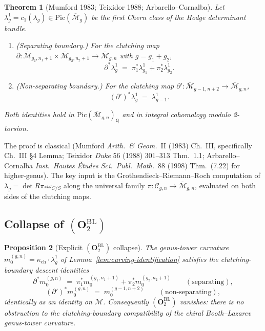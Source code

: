 \documentclass[11pt]{amsart}
\newtheorem{theorem}{Theorem}[section]
\newtheorem{proposition}[theorem]{Proposition}
\newcommand{\kch}{\kappa_{\mathrm{ch}}}
\newcommand{\Mbar}{\overline{\mathcal{M}}}
\newcommand{\bQ}{\mathbb{Q}}
\begin{document}
\begin{theorem}[Mumford 1983; Teixidor 1988; Arbarello--Cornalba]
\label{thm:mumford-boundary}
Let $\lambda_g^1 = c_1(\lambda_g) \in \mathrm{Pic}(\Mbar_g)$ be the
first Chern class of the Hodge determinant bundle.
\begin{enumerate}[leftmargin=2em]
\item \emph{(Separating boundary.)} For the clutching map
$\partial : \Mbar_{g_1,n_1+1} \times \Mbar_{g_2,n_2+1} \to
\Mbar_{g,n}$ with $g = g_1 + g_2$,
\[
\partial^* \lambda_g^1 \;=\;
\pi_1^* \lambda_{g_1}^1 + \pi_2^* \lambda_{g_2}^1.
\]
\item \emph{(Non-separating boundary.)} For the clutching map
$\partial' : \Mbar_{g-1,n+2} \to \Mbar_{g,n}$,
\[
(\partial')^* \lambda_g^1 \;=\; \lambda_{g-1}^1.
\]
\end{enumerate}
Both identities hold in $\mathrm{Pic}(\Mbar_{g,n})_\bQ$ and in
integral cohomology modulo 2-torsion.
\end{theorem}

The proof is classical (Mumford \emph{Arith.\ \& Geom.}\ II (1983)
Ch.\ III, specifically Ch.\ III \S 4 Lemma; Teixidor \emph{Duke}
56 (1988) 301--313 Thm.\ 1.1; Arbarello--Cornalba \emph{Inst.\
Hautes Études Sci.\ Publ.\ Math.}\ 88 (1998) Thm.\ (7.22) for
higher-genus). The key input is the Grothendieck--Riemann--Roch
computation of $\lambda_g = \det R\pi_\ast \omega_{C/S}$ along
the universal family $\pi : \mathcal{C}_{g,n} \to \Mbar_{g,n}$,
evaluated on both sides of the clutching maps.

\subsection{Collapse of $(\mathbf{O}_2^{\mathrm{BL}})$}

\begin{proposition}[Explicit $(\mathbf{O}_2^{\mathrm{BL}})$ collapse]
\label{prop:mumford-collapse-explicit}
The genus-tower curvature $m_0^{(g,n)} = \kch \cdot \lambda_g^1$ of
Lemma~\ref{lem:curving-identification} satisfies the clutching-boundary
descent identities
\[
\partial^* m_0^{(g,n)} \;=\; \pi_1^* m_0^{(g_1,n_1+1)} + \pi_2^* m_0^{(g_2,n_2+1)}
\qquad (\text{separating}),
\]
\[
(\partial')^* m_0^{(g,n)} \;=\; m_0^{(g-1,n+2)}
\qquad (\text{non-separating}),
\]
identically as an identity on $\Mbar$. Consequently
$(\mathbf{O}_2^{\mathrm{BL}})$ vanishes: there is no obstruction
to the clutching-boundary compatibility of the chiral Booth--Lazarev
genus-tower curvature.
\end{proposition}
\end{document}
